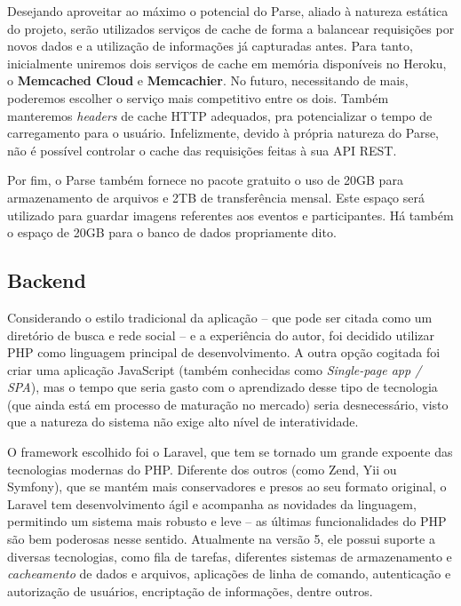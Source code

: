 \documentclass[12pt,a4paper,twoside,hyphens,english,brazil]{abntex2}
\begin{document}
{Desejando aproveitar ao máximo o potencial do Parse, aliado à natureza estática do projeto, serão utilizados serviços de cache de forma a balancear requisições por novos dados e a utilização de informações já capturadas antes. Para tanto, inicialmente uniremos dois serviços de cache em memória disponíveis no Heroku, o \textbf{Memcached Cloud} e \textbf{Memcachier}. No futuro, necessitando de mais, poderemos escolher o serviço mais competitivo entre os dois. Também manteremos \emph{headers} de cache HTTP adequados, pra potencializar o tempo de carregamento para o usuário. Infelizmente, devido à própria natureza do Parse, não é possível controlar o cache das requisições feitas à sua API REST.

Por fim, o Parse também fornece no pacote gratuito o uso de 20GB para armazenamento de arquivos e 2TB de transferência mensal\cite{parse-plans}. Este espaço será utilizado para guardar imagens referentes aos eventos e participantes. Há também o espaço de 20GB para o banco de dados propriamente dito.

\subsection{Backend}
Considerando o estilo tradicional da aplicação -- que pode ser citada como um diretório de busca e rede social -- e a experiência do autor, foi decidido utilizar PHP como linguagem principal de desenvolvimento. A outra opção cogitada foi criar uma aplicação JavaScript (também conhecidas como \emph{Single-page app / SPA}\cite{single-page-apps}), mas o tempo que seria gasto com o aprendizado desse tipo de tecnologia (que ainda está em processo de maturação no mercado) seria desnecessário, visto que a natureza do sistema não exige alto nível de interatividade.

O framework escolhido foi o Laravel, que tem se tornado um grande expoente das tecnologias modernas do PHP. Diferente dos outros (como Zend, Yii ou Symfony), que se mantém mais conservadores e presos ao seu formato original, o Laravel tem desenvolvimento ágil e acompanha as novidades da linguagem, permitindo um sistema mais robusto e leve -- as últimas funcionalidades do PHP são bem poderosas nesse sentido. Atualmente na versão 5, ele possui suporte a diversas tecnologias, como fila de tarefas, diferentes sistemas de armazenamento e \emph{cacheamento} de dados e arquivos, aplicações de linha de comando, autenticação e autorização de usuários, encriptação de informações, dentre outros.\cite{laravel}

}
\end{document}

